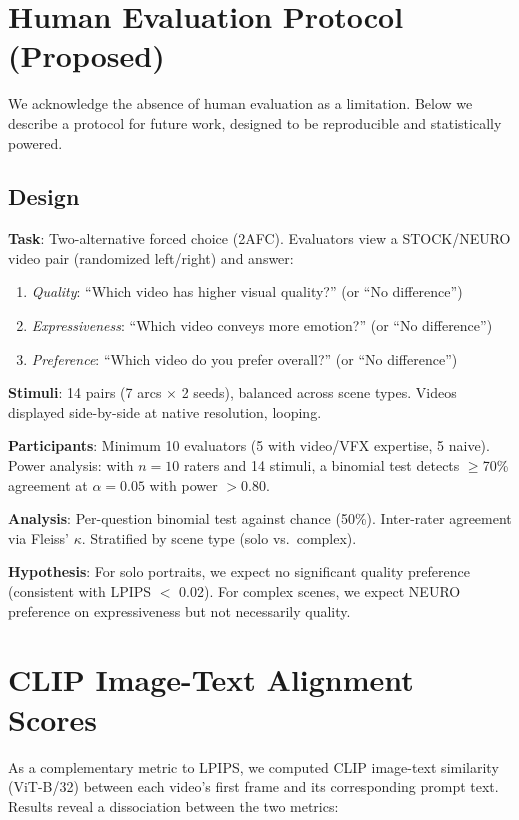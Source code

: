 \documentclass[10pt,twocolumn,letterpaper]{article}
\begin{document}
\section{Human Evaluation Protocol (Proposed)}

We acknowledge the absence of human evaluation as a limitation. Below we describe a protocol for future work, designed to be reproducible and statistically powered.

\subsection{Design}

\textbf{Task}: Two-alternative forced choice (2AFC). Evaluators view a STOCK/NEURO video pair (randomized left/right) and answer:

\begin{enumerate}
\item \textit{Quality}: ``Which video has higher visual quality?'' (or ``No difference'')
\item \textit{Expressiveness}: ``Which video conveys more emotion?'' (or ``No difference'')
\item \textit{Preference}: ``Which video do you prefer overall?'' (or ``No difference'')
\end{enumerate}

\textbf{Stimuli}: 14 pairs (7 arcs $\times$ 2 seeds), balanced across scene types. Videos displayed side-by-side at native resolution, looping.

\textbf{Participants}: Minimum 10 evaluators (5 with video/VFX expertise, 5 naive). Power analysis: with $n=10$ raters and 14 stimuli, a binomial test detects $\geq$70\% agreement at $\alpha = 0.05$ with power $> 0.80$.

\textbf{Analysis}: Per-question binomial test against chance (50\%). Inter-rater agreement via Fleiss' $\kappa$. Stratified by scene type (solo vs.\ complex).

\textbf{Hypothesis}: For solo portraits, we expect no significant quality preference (consistent with LPIPS $<$ 0.02). For complex scenes, we expect NEURO preference on expressiveness but not necessarily quality.

\section{CLIP Image-Text Alignment Scores}

As a complementary metric to LPIPS, we computed CLIP image-text similarity (ViT-B/32) between each video's first frame and its corresponding prompt text. Results reveal a dissociation between the two metrics:
\end{document}
